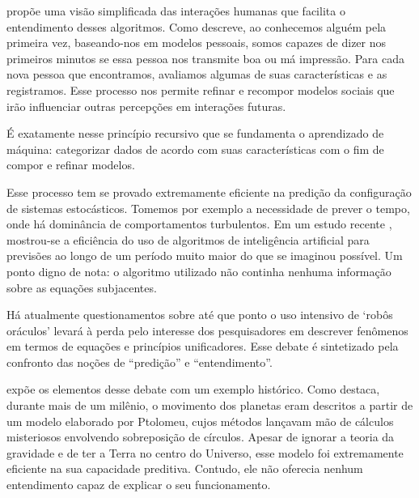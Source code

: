 propõe uma visão simplificada das interações humanas que facilita o entendimento desses algoritmos. Como descreve, ao conhecemos alguém pela primeira vez, baseando-nos em modelos pessoais, somos capazes de dizer nos primeiros minutos se essa pessoa nos transmite boa ou má impressão. Para cada nova pessoa que encontramos, avaliamos algumas de suas características e as registramos. Esse processo nos permite refinar e recompor modelos sociais que irão influenciar outras percepções em interações futuras. 

É exatamente nesse princípio recursivo que se fundamenta o aprendizado de máquina: categorizar dados de acordo com suas características com o fim de compor e refinar modelos.

Esse processo tem se provado extremamente eficiente na predição da configuração de sistemas estocásticos. Tomemos por exemplo a necessidade de prever o tempo, onde há dominância de comportamentos turbulentos. Em um estudo recente , mostrou-se a eficiência do uso de algoritmos de inteligência artificial para previsões ao longo de um período muito maior do que se imaginou possível. Um ponto digno de nota: o algoritmo utilizado não continha nenhuma informação sobre as equações subjacentes. 

Há atualmente questionamentos sobre até que ponto o uso intensivo de `robôs oráculos' levará à perda pelo interesse dos pesquisadores em descrever fenômenos em termos de equações e princípios unificadores. Esse debate é sintetizado pela confronto das noções de ``predição'' e ``entendimento''.

 expõe os elementos desse debate com um exemplo histórico. Como destaca, durante mais de um milênio, o movimento dos planetas eram descritos a partir de um modelo elaborado por Ptolomeu, cujos métodos lançavam mão de cálculos misteriosos envolvendo sobreposição de círculos. Apesar de ignorar a teoria da gravidade e de ter a Terra no centro do Universo, esse modelo foi extremamente eficiente na sua capacidade preditiva. Contudo, ele não oferecia nenhum entendimento capaz de explicar o seu funcionamento.

